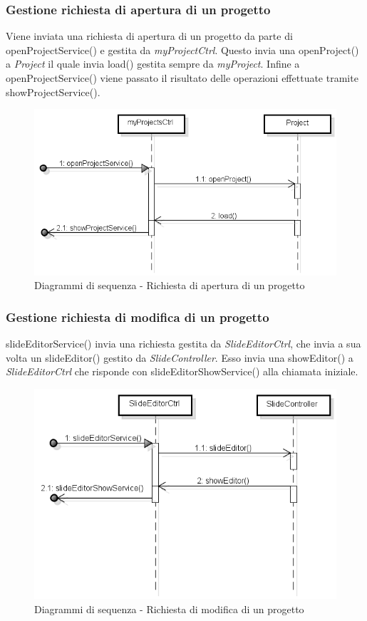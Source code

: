 \newpage	
	\subsubsection{Gestione richiesta di apertura di un progetto}
	Viene inviata una richiesta di apertura di un progetto da parte di openProjectService() e gestita da \textit{myProjectCtrl}. Questo invia una openProject() a \textit{Project} il quale invia load() gestita sempre da \textit{myProject}. Infine a openProjectService() viene passato il risultato delle operazioni effettuate tramite showProjectService().
	
	\begin{figure}[H]
		\centering
		\includegraphics[scale=0.5]{img/open.png}
		\caption{Diagrammi di sequenza - Richiesta di apertura di un progetto}
	\end{figure}
	
	\newpage
	
	\subsubsection{Gestione richiesta di modifica di un progetto}
	slideEditorService() invia una richiesta gestita da \textit{SlideEditorCtrl}, che invia a sua volta un slideEditor() gestito da \textit{SlideController}. Esso invia una showEditor() a \textit{SlideEditorCtrl} che risponde con slideEditorShowService() alla chiamata iniziale.
	
	\begin{figure}[H]
		\centering
		\includegraphics[scale=0.5]{img/modify.png}
		\caption{Diagrammi di sequenza - Richiesta di modifica di un progetto}
	\end{figure}
	
